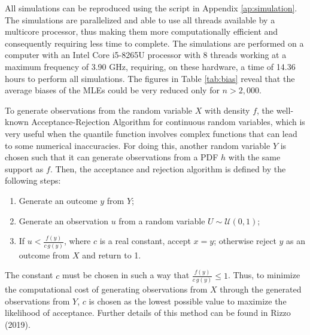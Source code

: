 \documentclass[12pt,a4paper]{article} %
\begin{document}
All simulations can be reproduced using the script in Appendix \ref{ap:simulation}. The simulations are parallelized and able to use all threads
available by a multicore processor, thus making them more computationally efficient and consequently requiring less time to complete.
The simulations are performed on a computer with an Intel Core i5-8265U processor with 8 threads working at a maximum frequency of 3.90 GHz,
requiring, on these hardware, a time of 14.36 hours to perform all simulations. The figures in Table \ref{tab:bias} reveal that the average
biases of the MLEs could be very reduced only for $n> 2,000$.

To generate observations from the random variable $X$ with density $f$, the well-known Acceptance-Rejection Algorithm for continuous random variables, which is very useful when the quantile function involves complex functions that can lead to some numerical inaccuracies. For doing this, another random variable $Y$ is chosen such that it can generate observations from a PDF $h$ with the same support as $f$. Then, the acceptance and rejection algorithm is defined by the following steps:
\begin{enumerate}
	\item Generate an outcome $y$ from $Y$;
	\item Generate an observation $u$ from a random variable $U\sim \mathcal{U}(0,1)$;
	\item If $u < \frac{f(y)}{c\, g(y)}$, where $c$ is a real constant, accept $x=y$; otherwise reject $y$ as an outcome from $X$ and return to 1.
\end{enumerate}

The constant $c$ must be chosen in such a way that $\frac{f(y)}{c \,g (y)}\leq 1 $. 
Thus, to minimize the computational cost of generating observations from $X$ through the generated observations from $Y$, $c$ is chosen 
as the lowest possible value to maximize the likelihood of acceptance. Further details of this method can be found in Rizzo (2019).
\end{document}
